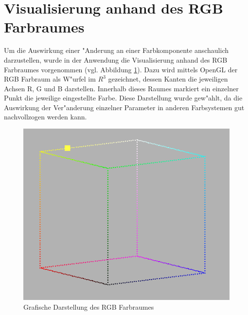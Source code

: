 \documentclass[a4paper]{article}
\begin{document}
\section{Visualisierung anhand des RGB Farbraumes}

Um die Auswirkung einer "Anderung an einer Farbkomponente anschaulich darzustellen, wurde
in der Anwendung die Visualisierung anhand des RGB Farbraumes vorgenommen (vgl. Abbildung \ref{RGBCube}). Dazu wird mittels OpenGL
der RGB Farbraum als W"urfel im $R^3$ gezeichnet, dessen Kanten die jeweiligen Achsen R, G und B darstellen.
Innerhalb dieses Raumes markiert ein einzelner Punkt die jeweilige eingestellte Farbe. Diese Darstellung wurde
gew"ahlt, da die Auswirkung der Ver"anderung einzelner Parameter in anderen Farbsystemen gut nachvollzogen werden kann.

\begin{figure}[htp]
\centering
\includegraphics[scale=0.60]{RGBCube.png}
\caption{Grafische Darstellung des RGB Farbraumes}
\label{RGBCube}
\end{figure}
\newpage

{}

\end{document}
